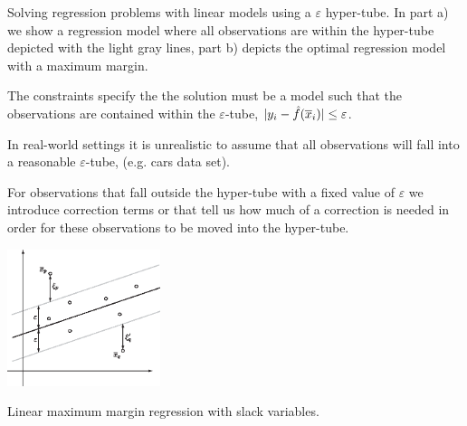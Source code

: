 \documentclass[a4paper,blends,pdf,colorBG,slideColor]{prosper}
\begin{document}
Solving regression problems with linear models using a $\varepsilon$ hyper-tube.
In part a) we show a regression model where all observations are within the hyper-tube depicted with 
the light gray lines,
part b) depicts the optimal regression model with a maximum margin.
\es



The constraints specify the the solution must be a model such that the observations are contained
within the $\varepsilon$-tube, $|{y_i - \hat{f}(\overline{x}_i)}| \le \varepsilon$.
\es


\small
In real-world settings it is unrealistic to assume that all observations will fall into a reasonable
$\varepsilon$-tube, (e.g. cars data set). 

For observations that fall outside the hyper-tube with a fixed value of $\varepsilon$ we introduce correction terms or  that tell us how much of a correction is needed in order for these observations to be moved
into the hyper-tube.


\begin{center}
\includegraphics[height=40mm]{figures/fig12-04.eps}
\end{center}
Linear maximum margin regression with slack variables.
\es
\end{document}
